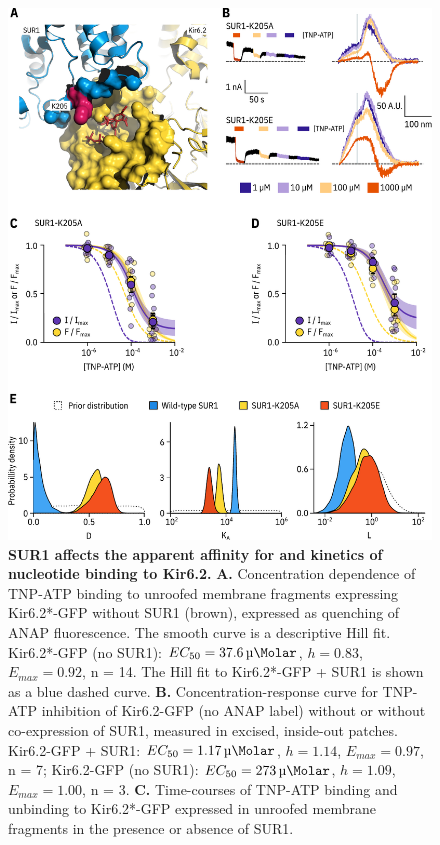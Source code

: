\documentclass[9pt,lineno, onehalfspacing]{elife_modified}
\begin{document}
\begin{figure}
\begin{fullwidth}
\includegraphics[height=0.72\textheight]{figure_four}
\caption{
\textbf{SUR1 affects the apparent affinity for and kinetics of nucleotide binding to Kir6.2.}
\textbf{A.}
Concentration dependence of TNP-ATP binding to unroofed membrane fragments expressing Kir6.2*-GFP without SUR1 (brown), expressed as quenching of ANAP fluorescence.
The smooth curve is a descriptive Hill fit.
Kir6.2*-GFP (no SUR1): $EC_{50} = \SI{37.6}{\micro\Molar}$, $h = 0.83$, $E_{max} = 0.92$, n = 14.
The Hill fit to Kir6.2*-GFP + SUR1 is shown as a blue dashed curve.
\textbf{B.}
Concentration-response curve for TNP-ATP inhibition of Kir6.2-GFP (no ANAP label) without or without co-expression of SUR1, measured in excised, inside-out patches.
Kir6.2-GFP + SUR1: $EC_{50} = \SI{1.17}{\micro\Molar}$, $h = 1.14$, $E_{max} = 0.97$, n = 7; Kir6.2-GFP (no SUR1): $EC_{50} = \SI{273}{\micro\Molar}$, $h = 1.09$, $E_{max} = 1.00$, n = 3.
\textbf{C.}
Time-courses of TNP-ATP binding and unbinding to Kir6.2*-GFP expressed in unroofed membrane fragments in the presence or absence of SUR1.
}
\end{fullwidth}
\end{figure}
\end{document}
